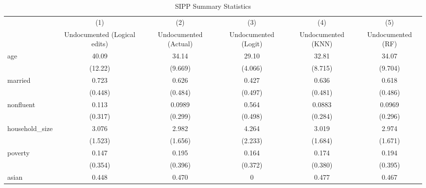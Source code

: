 \begin{table}[htbp]\centering
\def\sym#1{\ifmmode^{#1}\else\(^{#1}\)\fi}
\caption{SIPP Summary Statistics \label{tab:sum}}
\begin{tabular}{l*{5}{c}}
\hline\hline
                    &\multicolumn{1}{c}{(1)}         &\multicolumn{1}{c}{(2)}         &\multicolumn{1}{c}{(3)}         &\multicolumn{1}{c}{(4)}         &\multicolumn{1}{c}{(5)}         \\
                    &Undocumented (Logical edits)         &Undocumented (Actual)         &Undocumented (Logit)         &Undocumented (KNN)         &Undocumented (RF)         \\
\hline
age                 &       40.09         &       34.14         &       29.10         &       32.81         &       34.07         \\
                    &     (12.22)         &     (9.669)         &     (4.066)         &     (8.715)         &     (9.704)         \\
[1em]
married             &       0.723         &       0.626         &       0.427         &       0.636         &       0.618         \\
                    &     (0.448)         &     (0.484)         &     (0.497)         &     (0.481)         &     (0.486)         \\
[1em]
nonfluent           &       0.113         &      0.0989         &       0.564         &      0.0883         &      0.0969         \\
                    &     (0.317)         &     (0.299)         &     (0.498)         &     (0.284)         &     (0.296)         \\
[1em]
household\_size      &       3.076         &       2.982         &       4.264         &       3.019         &       2.974         \\
                    &     (1.523)         &     (1.656)         &     (2.233)         &     (1.684)         &     (1.671)         \\
[1em]
poverty             &       0.147         &       0.195         &       0.164         &       0.174         &       0.194         \\
                    &     (0.354)         &     (0.396)         &     (0.372)         &     (0.380)         &     (0.395)         \\
[1em]
asian               &       0.448         &       0.470         &           0         &       0.477         &       0.467         \\

\end{tabular}
\end{table}
